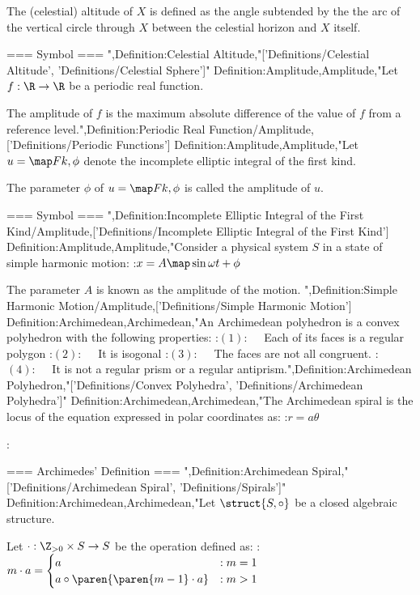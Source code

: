 The (celestial) altitude of $X$ is defined as the angle subtended by the the arc of the vertical circle through $X$ between the celestial horizon and $X$ itself.


=== Symbol ===
",Definition:Celestial Altitude,"['Definitions/Celestial Altitude', 'Definitions/Celestial Sphere']"
Definition:Amplitude,Amplitude,"Let $f: \R \to \R$ be a periodic real function.


The amplitude of $f$ is the maximum absolute difference of the value of $f$ from a reference level.",Definition:Periodic Real Function/Amplitude,['Definitions/Periodic Functions']
Definition:Amplitude,Amplitude,"Let $u = \map F {k, \phi}$ denote the incomplete elliptic integral of the first kind.

The parameter $\phi$ of $u = \map F {k, \phi}$ is called the amplitude of $u$.


=== Symbol ===
",Definition:Incomplete Elliptic Integral of the First Kind/Amplitude,['Definitions/Incomplete Elliptic Integral of the First Kind']
Definition:Amplitude,Amplitude,"Consider a physical system $S$ in a state of simple harmonic motion:
:$x = A \map \sin {\omega t + \phi}$


The parameter $A$ is known as the amplitude of the motion.
",Definition:Simple Harmonic Motion/Amplitude,['Definitions/Simple Harmonic Motion']
Definition:Archimedean,Archimedean,"An Archimedean polyhedron is a convex polyhedron with the following properties:
:$(1): \quad$ Each of its faces is a regular polygon
:$(2): \quad$ It is isogonal
:$(3): \quad$ The faces are not all congruent.
:$(4): \quad$ It is not a regular prism or a regular antiprism.",Definition:Archimedean Polyhedron,"['Definitions/Convex Polyhedra', 'Definitions/Archimedean Polyhedra']"
Definition:Archimedean,Archimedean,"The Archimedean spiral is the locus of the equation expressed in polar coordinates as:
:$r = a \theta$


:


=== Archimedes' Definition ===
",Definition:Archimedean Spiral,"['Definitions/Archimedean Spiral', 'Definitions/Spirals']"
Definition:Archimedean,Archimedean,"Let $\struct {S, \circ}$ be a closed algebraic structure.

Let $\cdot: \Z_{>0} \times S \to S$ be the operation defined as:
:$m \cdot a = \begin{cases}
a & : m = 1 \\
a \circ \paren {\paren {m - 1} \cdot a} & : m > 1 \end {cases}$


